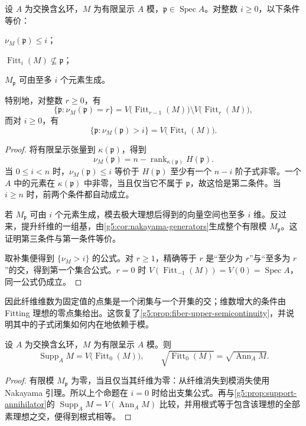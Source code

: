 \begin{proposition}\label{g5:prop:fitting-fiber-rank}
	设 \(A\) 为交换含幺环，\(M\) 为有限呈示 \(A\) 模，\(\mathfrak p\in\operatorname{Spec}A\)。对整数 \(i\geq0\)，以下条件等价：
	\begin{equivalences}
		\item \(\nu_M(\mathfrak p)\leq i\)；
		\item \(\operatorname{Fitt}_i(M)\nsubseteq\mathfrak p\)；
		\item \(M_{\mathfrak p}\) 可由至多 \(i\) 个元素生成。
	\end{equivalences}
	特别地，对整数 \(r\geq0\)，有
	\[
		\{\mathfrak p:\nu_M(\mathfrak p)=r\}
		=V\bigl(\operatorname{Fitt}_{r-1}(M)\bigr)
		\setminus V\bigl(\operatorname{Fitt}_r(M)\bigr),
	\]
	而对 \(i\geq0\)，有
	\[
		\{\mathfrak p:\nu_M(\mathfrak p)>i\}
		=V\bigl(\operatorname{Fitt}_i(M)\bigr).
	\]
\end{proposition}
\begin{proof}
	将有限呈示张量到 \(\kappa(\mathfrak p)\)，得到
	\[
		\nu_M(\mathfrak p)
		=n-\operatorname{rank}_{\kappa(\mathfrak p)}H(\mathfrak p).
	\]
	当 \(0\leq i<n\) 时，\(\nu_M(\mathfrak p)\leq i\) 等价于 \(H(\mathfrak p)\) 至少有一个 \(n-i\) 阶子式非零。一个 \(A\) 中的元素在 \(\kappa(\mathfrak p)\) 中非零，当且仅当它不属于 \(\mathfrak p\)，故这恰是第二条件。当 \(i\geq n\) 时，前两个条件都自动成立。

	若 \(M_{\mathfrak p}\) 可由 \(i\) 个元素生成，模去极大理想后得到的向量空间也至多 \(i\) 维。反过来，提升纤维的一组基，由\cref{g5:cor:nakayama-generators}生成整个有限模 \(M_{\mathfrak p}\)。这证明第三条件与第一条件等价。

	取补集便得到 \(\{\nu_M>i\}\) 的公式。对 \(r\geq1\)，精确等于 \(r\) 是“至少为 \(r\)”与“至多为 \(r\)”的交，得到第一个集合公式。\(r=0\) 时 \(V(\operatorname{Fitt}_{-1}(M))=V(0)=\operatorname{Spec}A\)，同一公式仍成立。
\end{proof}

因此纤维维数为固定值的点集是一个闭集与一个开集的交；维数增大的条件由 Fitting 理想的零点集给出。这恢复了\cref{g5:prop:fiber-upper-semicontinuity}，并说明其中的子式闭集如何内在地依赖于模。

\begin{corollary}\label{g5:cor:fitting-support}
	设 \(A\) 为交换含幺环，\(M\) 为有限呈示 \(A\) 模。则
	\[
		\operatorname{Supp}_A M=V\bigl(\operatorname{Fitt}_0(M)\bigr),
		\qquad
		\sqrt{\operatorname{Fitt}_0(M)}=\sqrt{\operatorname{Ann}_A M}.
	\]
\end{corollary}
\begin{proof}
	有限模 \(M_{\mathfrak p}\) 为零，当且仅当其纤维为零：从纤维消失到模消失使用 Nakayama 引理。所以上个命题在 \(i=0\) 时给出支集公式。再与\cref{g5:prop:support-annihilator}的 \(\operatorname{Supp}_A M=V(\operatorname{Ann}_A M)\) 比较，并用根式等于包含该理想的全部素理想之交，便得到根式相等。
\end{proof}

